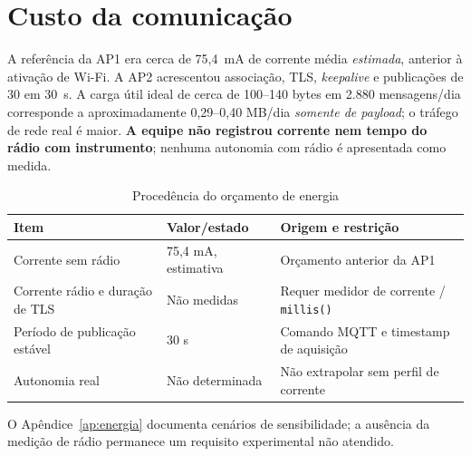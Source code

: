 \section{Custo da comunicação}\label{sec:custo-radio}
A referência da AP1 era cerca de 75,4~mA de corrente média \emph{estimada}, anterior à ativação de Wi-Fi. A AP2 acrescentou associação, TLS, \emph{keepalive} e publicações de 30 em 30~s. A carga útil ideal de cerca de 100--140 bytes em 2.880 mensagens/dia corresponde a aproximadamente 0,29--0,40 MB/dia \emph{somente de payload}; o tráfego de rede real é maior. \textbf{A equipe não registrou corrente nem tempo do rádio com instrumento}; nenhuma autonomia com rádio é apresentada como medida.
\begin{table}[H]\centering\caption{Procedência do orçamento de energia}\label{tab:custo-radio}\footnotesize
\begin{tabular}{@{}L{4.5cm}L{3.1cm}L{6.5cm}@{}}\toprule
Item&Valor/estado&Origem e restrição\\\midrule
Corrente sem rádio&75,4 mA, estimativa&Orçamento anterior da AP1\\
Corrente rádio e duração de TLS&Não medidas&Requer medidor de corrente / \texttt{millis()}\\
Período de publicação estável&30 s&Comando MQTT e timestamp de aquisição\\
Autonomia real&Não determinada&Não extrapolar sem perfil de corrente\\\bottomrule\end{tabular}\end{table}
O Apêndice~\ref{ap:energia} documenta cenários de sensibilidade; a ausência da medição de rádio permanece um requisito experimental não atendido.\par
